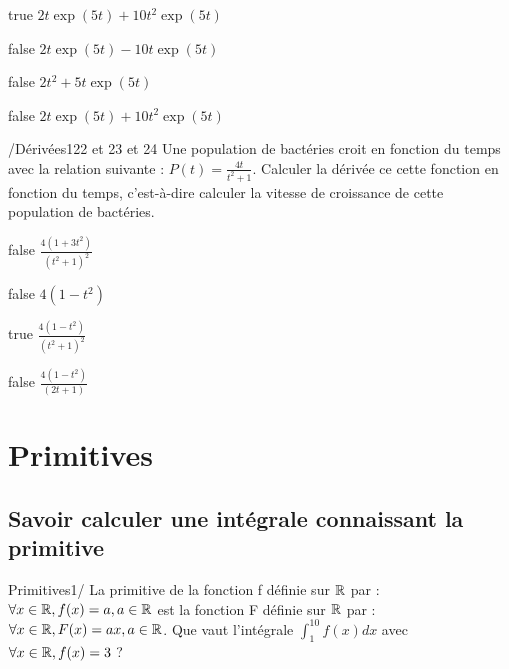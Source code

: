 \documentclass[11pt]{article}
\begin{document}
            \begin{reponses}
            	\item[true]   $2t\exp(5t)+10t^{2}\exp(5t)$ 
            	\item[false]  $2t\exp(5t)-10t\exp(5t) $ 
                \item[false]  $2t^{2}+5t\exp(5t) $ 
                \item[false]  $2t\exp(5t)+10t^{2}\exp(5t) $ 
            \end{reponses}

       
			
			\begin{question}{/}{Dérivées}{1}{22 et 23 et 24}
				Une population de bactéries croit en fonction du temps avec la relation suivante : $P(t) = \frac{4t}{t^{2}+1}$. Calculer la dérivée ce cette fonction en fonction du temps, c'est-à-dire calculer la vitesse de croissance de cette population de bactéries.

            \end{question}

            \begin{reponses}
            	\item[false] $\frac{4(1+3t^{2})}{(t^{2}+1)^{2}}$
            	\item[false]  $ 4(1-t^{2})$
                \item[true]  $\frac{4(1-t^{2})}{(t^{2}+1)^{2}}$
                \item[false] $ \frac{4(1-t^{2})}{(2t+1)}$
            \end{reponses}
			
    \section{Primitives}

        \subsection{Savoir calculer une intégrale connaissant la primitive}
        
        	\begin{question}{60}{Primitives}{1}{/}
				La primitive de la fonction f définie sur $\mathbb {R} $ par : $\forall x \in \mathbb {R} , f(x)=a, a \in \mathbb {R} $ est la fonction F définie sur $\mathbb {R} $ par : $\forall x \in \mathbb {R} , F(x)=ax, a \in \mathbb {R}  $. Que vaut l'intégrale $\int_{1}^{10} f(x) dx$ avec $\forall x \in \mathbb {R} , f(x)=3$ ? 
            \end{question}
\end{document}
